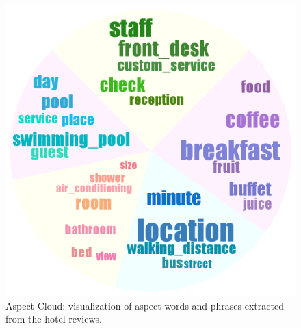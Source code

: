 \begin{figure}[th]
	\centering
	\includegraphics[width=0.8\columnwidth]{figures/topics_hotel}
	\caption{Aspect Cloud: visualization of aspect words and phrases extracted from the hotel reviews.}
	\label{fig:topiccloud}
\end{figure}

